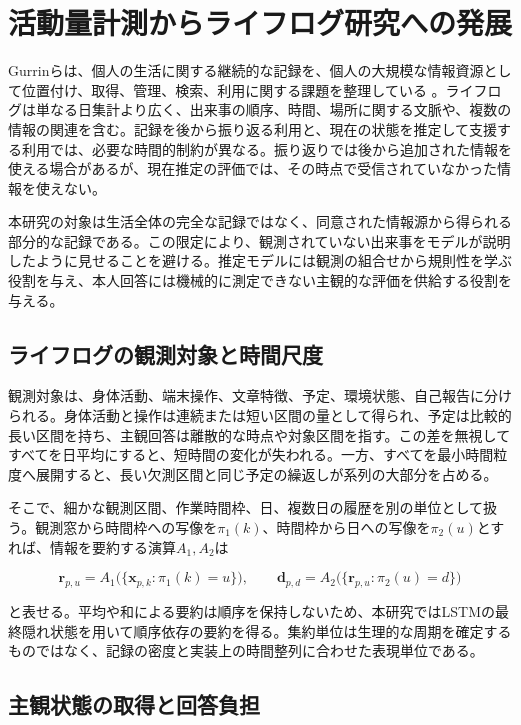 \section{活動量計測からライフログ研究への発展}

Gurrinらは、個人の生活に関する継続的な記録を、個人の大規模な情報資源として位置付け、取得、管理、検索、利用に関する課題を整理している \autocite{gurrin2014lifelogging}。ライフログは単なる日集計より広く、出来事の順序、時間、場所に関する文脈や、複数の情報の関連を含む。記録を後から振り返る利用と、現在の状態を推定して支援する利用では、必要な時間的制約が異なる。振り返りでは後から追加された情報を使える場合があるが、現在推定の評価では、その時点で受信されていなかった情報を使えない。

本研究の対象は生活全体の完全な記録ではなく、同意された情報源から得られる部分的な記録である。この限定により、観測されていない出来事をモデルが説明したように見せることを避ける。推定モデルには観測の組合せから規則性を学ぶ役割を与え、本人回答には機械的に測定できない主観的な評価を供給する役割を与える。

\subsection{ライフログの観測対象と時間尺度}

観測対象は、身体活動、端末操作、文章特徴、予定、環境状態、自己報告に分けられる。身体活動と操作は連続または短い区間の量として得られ、予定は比較的長い区間を持ち、主観回答は離散的な時点や対象区間を指す。この差を無視してすべてを日平均にすると、短時間の変化が失われる。一方、すべてを最小時間粒度へ展開すると、長い欠測区間と同じ予定の繰返しが系列の大部分を占める。

そこで、細かな観測区間、作業時間枠、日、複数日の履歴を別の単位として扱う。観測窓から時間枠への写像を\(\pi_1(k)\)、時間枠から日への写像を\(\pi_2(u)\)とすれば、情報を要約する演算\(A_1,A_2\)は

\[
\boldsymbol{r}_{p,u}
=A_1\bigl(\{\boldsymbol{x}_{p,k}:\pi_1(k)=u\}\bigr),\qquad
\boldsymbol{d}_{p,d}
=A_2\bigl(\{\boldsymbol{r}_{p,u}:\pi_2(u)=d\}\bigr)
\]

と表せる。平均や和による要約は順序を保持しないため、本研究ではLSTMの最終隠れ状態を用いて順序依存の要約を得る。集約単位は生理的な周期を確定するものではなく、記録の密度と実装上の時間整列に合わせた表現単位である。

\subsection{主観状態の取得と回答負担}

